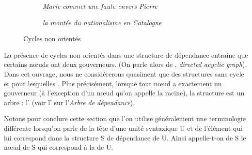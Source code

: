 \begin{figure}
\begin{subfigure}[b]{.5\textwidth}\centering
{}
\caption{\textit{Marie commet une faute envers Pierre}}
\end{subfigure}%
\begin{subfigure}[b]{.5\textwidth}\centering
{}
\caption{\textit{la montée du nationalisme en Catalogne}}
\end{subfigure}
\caption{Cycles non orientés\label{fig:3.3-cycles}}
\end{figure}

La présence de cycles non orientés dans une structure de dépendance entraîne que certains nœuds ont deux gouverneurs. (On parle alors de , \textit{directed acyclic graph}). Dans cet ouvrage, nous ne considérerons quasiment que des structures sans cycle et pour lesquelles  . Plus précisément, lorsque tout nœud a exactement un gouverneur (à l’exception d’un nœud qu’on appelle la racine), la structure est un arbre : l’ (voir l' sur l'\textit{Arbre de dépendance}).

Notons pour conclure cette section que l’on utilise généralement une terminologie différente lorsqu’on parle de la tête d’une unité syntaxique U et de l'élément qui lui correspond dans la structure S de dépendance de U. Ainsi appelle-t-on  de S le nœud de S qui correspond à la  de U.\largerpage

